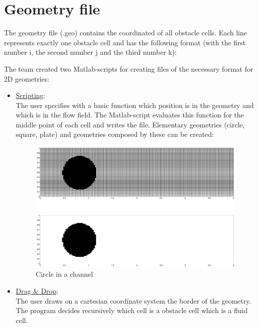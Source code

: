 \section{Geometry file} %
\label{sec:geometry_file}

The geometry file (.geo) contains the coordinated of all obstacle cells. Each line represents exactly one obstacle cell and has the following format (with the first number i, the second number j and the third number k):


\noii The team created two Matlab-scripts for creating files of the necessary format for 2D geometries:
\begin{itemize}
\item \underline{Scripting}:\\
The user specifies with a basic function which position is in the geometry and which is in the flow field. The Matlab-script evaluates this function for the middle point of each cell and writes the file. Elementary geometries (circle, square, plate) and geometries composed by these can be created:

\begin{figure}[!htb]
\centering
\includegraphics[scale=.3]{FIGURES/circle.eps}
\caption{Circle in a channel}
\label{fig:circle_in_channel}
\end{figure} 

\item \underline{Drag \& Drop}:\\
The user draws on a cartesian coordinate system the border of the geometry. The program decides recursively which cell is a obstacle cell which is a fluid cell.
\end{itemize}




